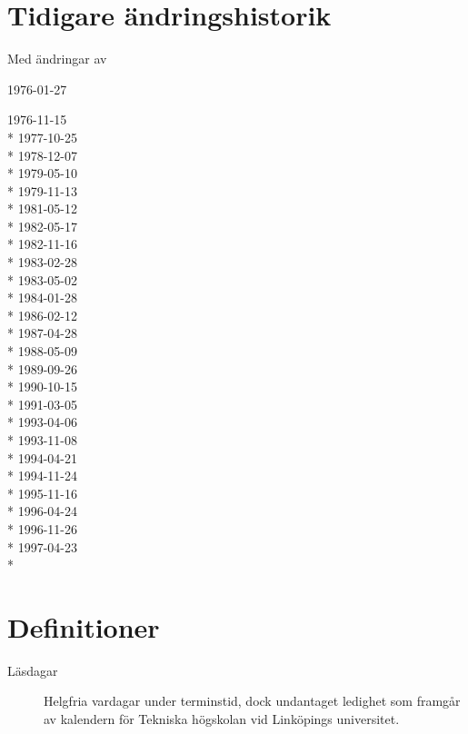 \documentclass{datateknologsektionen-document}
\begin{document}
\section*{Tidigare ändringshistorik}
\begin{labeling}{Med ändringar av}
  \item [Antagna] 1976-01-27
  \item [Med ändringar av]
  1976-11-15 \\*
  1977-10-25 \\*
  1978-12-07 \\*
  1979-05-10 \\*
  1979-11-13 \\*
  1981-05-12 \\*
  1982-05-17 \\*
  1982-11-16 \\*
  1983-02-28 \\*
  1983-05-02 \\*
  1984-01-28 \\*
  1986-02-12 \\*
  1987-04-28 \\*
  1988-05-09 \\*
  1989-09-26 \\*
  1990-10-15 \\*
  1991-03-05 \\*
  1993-04-06 \\*
  1993-11-08 \\*
  1994-04-21 \\*
  1994-11-24 \\*
  1995-11-16 \\*
  1996-04-24 \\*
  1996-11-26 \\*
  1997-04-23 \\*
\end{labeling}
\pagebreak

\tableofcontents

\pagebreak

\section*{Definitioner}
\begin{description}
  \item [Läsdagar]
        Helgfria vardagar under terminstid, dock undantaget ledighet som
        framgår av kalendern för Tekniska högskolan vid Linköpings universitet.
\end{description}
\end{document}
